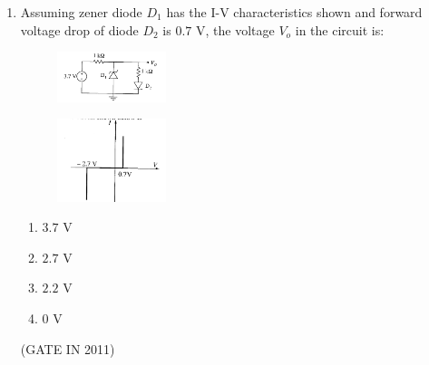 \documentclass[journal]{IEEEtran}
\begin{document}
\begin{enumerate}
\item Assuming zener diode $D_1$ has the I-V characteristics shown and forward voltage drop of diode $D_2$ is $0.7$ V, the voltage $V_o$ in the circuit is:
\begin{multicols}{2}
\begin{figure}[H]
      \includegraphics[width=0.3\textwidth]{9.png} 
      \caption{}
    \label{fig:fig9} 
\end{figure}
\begin{figure}[H]
      \includegraphics[width=0.3\textwidth]{10.png} 
      \caption{}
    \label{fig:fig10} 
\end{figure}
\end{multicols}
\begin{multicols}{4}
\begin{enumerate}
\item $3.7$ V  
\item $2.7$ V  
\item $2.2$ V  
\item $0$ V
\end{enumerate}
\end{multicols} \hfill(GATE IN 2011)


\end{enumerate}
\end{document}
